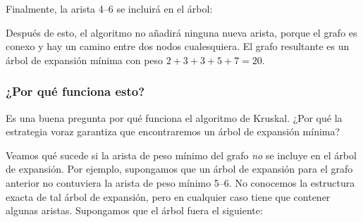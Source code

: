 \begin{samepage}
Finalmente, la arista 4--6 se incluirá en el árbol:

\begin{center}
\end{center}
\end{samepage}

Después de esto, el algoritmo no añadirá ninguna
nueva arista, porque el grafo es conexo
y hay un camino entre dos nodos cualesquiera.
El grafo resultante es un árbol de expansión mínima
con peso $2+3+3+5+7=20$.

\subsubsection{¿Por qué funciona esto?}

Es una buena pregunta por qué funciona el algoritmo de Kruskal.
¿Por qué la estrategia voraz garantiza que
encontraremos un árbol de expansión mínima?

Veamos qué sucede si la arista de peso mínimo del
grafo \emph{no} se incluye en el árbol de expansión.
Por ejemplo, supongamos que un árbol de expansión
para el grafo anterior no contuviera la
arista de peso mínimo 5--6.
No conocemos la estructura exacta de tal árbol de expansión,
pero en cualquier caso tiene que contener algunas aristas.
Supongamos que el árbol fuera el siguiente:

\begin{center}
\end{center}

